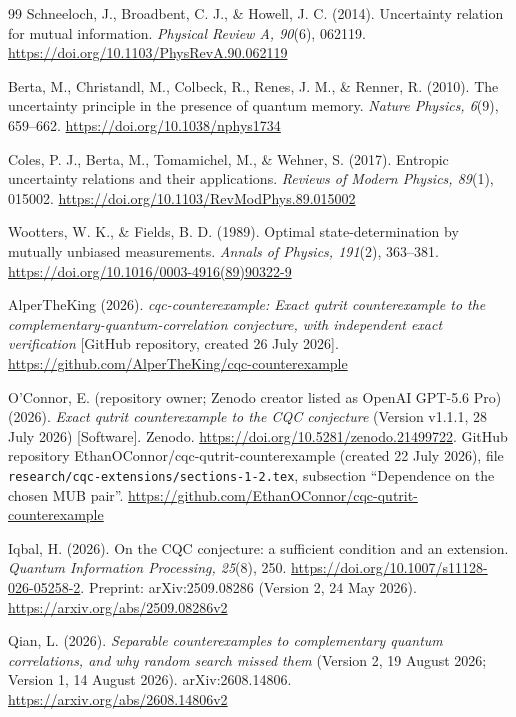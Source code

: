 \documentclass[11pt,a4paper]{article}
\numberwithin{equation}{section}
\theoremstyle{remark}\newtheorem{remark}[theorem]{Remark}
\begin{document}
\begin{thebibliography}{99}
Schneeloch, J., Broadbent, C. J., \& Howell, J. C. (2014).
Uncertainty relation for mutual information.
\emph{Physical Review A, 90}(6), 062119.
\url{https://doi.org/10.1103/PhysRevA.90.062119}

Berta, M., Christandl, M., Colbeck, R., Renes, J. M., \& Renner, R. (2010).
The uncertainty principle in the presence of quantum memory.
\emph{Nature Physics, 6}(9), 659--662.
\url{https://doi.org/10.1038/nphys1734}

Coles, P. J., Berta, M., Tomamichel, M., \& Wehner, S. (2017).
Entropic uncertainty relations and their applications.
\emph{Reviews of Modern Physics, 89}(1), 015002.
\url{https://doi.org/10.1103/RevModPhys.89.015002}

Wootters, W. K., \& Fields, B. D. (1989).
Optimal state-determination by mutually unbiased measurements.
\emph{Annals of Physics, 191}(2), 363--381.
\url{https://doi.org/10.1016/0003-4916(89)90322-9}

AlperTheKing (2026).
\emph{cqc-counterexample: Exact qutrit counterexample to the complementary-quantum-correlation conjecture, with independent exact verification} [GitHub repository, created 26 July 2026].
\url{https://github.com/AlperTheKing/cqc-counterexample}

O'Connor, E. (repository owner; Zenodo creator listed as OpenAI GPT-5.6 Pro) (2026).
\emph{Exact qutrit counterexample to the CQC conjecture} (Version v1.1.1, 28 July 2026) [Software]. Zenodo.
\url{https://doi.org/10.5281/zenodo.21499722}.
GitHub repository EthanOConnor/cqc-qutrit-counterexample (created 22 July 2026), file \texttt{research/cqc-extensions/sections-1-2.tex}, subsection ``Dependence on the chosen MUB pair''.
\url{https://github.com/EthanOConnor/cqc-qutrit-counterexample}

Iqbal, H. (2026).
On the CQC conjecture: a sufficient condition and an extension.
\emph{Quantum Information Processing, 25}(8), 250.
\url{https://doi.org/10.1007/s11128-026-05258-2}.
Preprint: arXiv:2509.08286 (Version 2, 24 May 2026).
\url{https://arxiv.org/abs/2509.08286v2}

Qian, L. (2026). \emph{Separable counterexamples to complementary quantum correlations, and why random search missed them} (Version 2, 19 August 2026; Version 1, 14 August 2026). arXiv:2608.14806.
\url{https://arxiv.org/abs/2608.14806v2}


\end{thebibliography}
\end{document}
